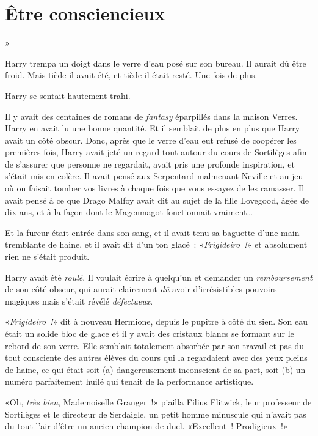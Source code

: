 \chapter{Être consciencieux}

»

\hplettrineextrapara
Harry trempa un doigt dans le verre d'eau posé sur son bureau. Il aurait dû être froid. Mais tiède il avait été, et tiède il était resté. Une fois de plus.

Harry se sentait hautement trahi.

Il y avait des centaines de romans de \emph{fantasy} éparpillés dans la maison Verres. Harry en avait lu une bonne quantité. Et il semblait de plus en plus que Harry avait un côté obscur. Donc, après que le verre d'eau eut refusé de coopérer les premières fois, Harry avait jeté un regard tout autour du cours de Sortilèges afin de s'assurer que personne ne regardait, avait pris une profonde inspiration, et s'était mis en colère. Il avait pensé aux Serpentard malmenant Neville et au jeu où on faisait tomber vos livres à chaque fois que vous essayez de les ramasser. Il avait pensé à ce que Drago Malfoy avait dit au sujet de la fille Lovegood, âgée de dix ans, et à la façon dont le Magenmagot fonctionnait vraiment…

Et la fureur était entrée dans son sang, et il avait tenu sa baguette d'une main tremblante de haine, et il avait dit d'un ton glacé~: «\emph{Frigideiro~!}» et absolument rien ne s'était produit.

Harry avait été \emph{roulé}. Il voulait écrire à quelqu'un et demander un \emph{remboursement} de son côté obscur, qui aurait clairement \emph{dû} avoir d'irrésistibles pouvoirs magiques mais s'était révélé \emph{défectueux}.

«\emph{Frigideiro~!}» dit à nouveau Hermione, depuis le pupitre à côté du sien. Son eau était un solide bloc de glace et il y avait des cristaux blancs se formant sur le rebord de son verre. Elle semblait totalement absorbée par son travail et pas du tout consciente des autres élèves du cours qui la regardaient avec des yeux pleins de haine, ce qui était soit (a) dangereusement inconscient de sa part, soit (b) un numéro parfaitement huilé qui tenait de la performance artistique.

«Oh, \emph{très bien}, Mademoiselle Granger~!» piailla Filius Flitwick, leur professeur de Sortilèges et le directeur de Serdaigle, un petit homme minuscule qui n'avait pas du tout l'air d'être un ancien champion de duel. «Excellent~! Prodigieux~!»

